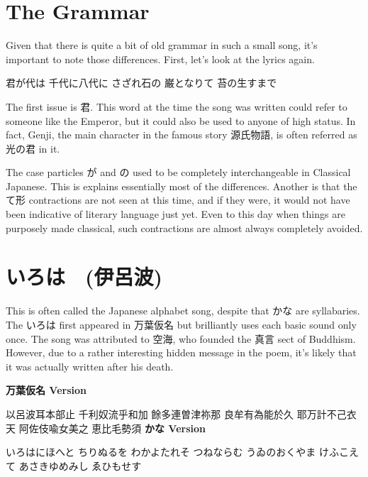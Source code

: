\section{The Grammar}
 
\par{ Given that there is quite a bit of old grammar in such a small song, it's important to note those differences. First, let's look at the lyrics again. }

\begin{center}
君が代は \hfill\break
千代に八代に \hfill\break
さざれ石の \hfill\break
巌となりて \hfill\break
苔の生すまで 
\end{center}

\par{ The first issue is 君. This word at the time the song was written could refer to someone like the Emperor, but it could also be used to anyone of high status. In fact, Genji, the main character in the famous story 源氏物語, is often referred as 光の君 in it. }

\par{ The case particles が and の used to be completely interchangeable in Classical Japanese. This is explains essentially most of the differences. Another is that the て形 contractions are not seen at this time, and if they were, it would not have been indicative of literary language just yet. Even to this day when things are purposely made classical, such contractions are almost always completely avoided. }
      
\section{いろは　(伊呂波)}
 
\par{ This is often called the Japanese alphabet song, despite that かな are syllabaries. The いろは first appeared in 万葉仮名 but brilliantly uses each basic sound only once. The song was attributed to 空海, who founded the 真言 sect of Buddhism. However, due to a rather interesting hidden message in the poem, it's likely that it was actually written after his death. }

\begin{center}
 \textbf{万葉仮名 Version }
\end{center}
  以呂波耳本部止 千利奴流乎和加  餘多連曽津祢那 \hfill\break
 良牟有為能於久 \hfill\break
 耶万計不己衣天 \hfill\break
 阿佐伎喩女美之 \hfill\break
 恵比毛勢須  \textbf{かな Version }
\begin{center}
いろはにほへと \hfill\break
ちりぬるを \hfill\break
わかよたれそ \hfill\break
つねならむ \hfill\break
うゐのおくやま \hfill\break
けふこえて \hfill\break
あさきゆめみし \hfill\break
ゑひもせす 
\end{center}

